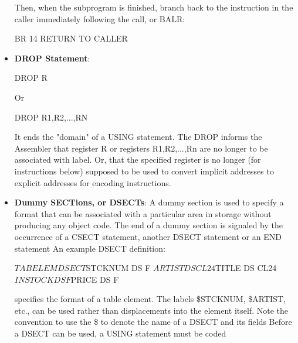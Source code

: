 \documentclass{report}
\begin{document}
\begin{itemize}
\begin{cppcode}
            \end{cppcode}
            \bigbreak \noindent 
            Then, when the subprogram is finished, branch back to the instruction in the caller immediately following the call, or BALR:
            \bigbreak \noindent 
            \begin{cppcode}
                BR 14 RETURN TO CALLER 
            \end{cppcode}
        \item \textbf{DROP Statement}:
            \bigbreak \noindent 
            \begin{cppcode}
            DROP R
            \end{cppcode}
            \bigbreak \noindent 
            Or
            \bigbreak \noindent 
            \begin{cppcode}
            DROP R1,R2,...,RN
            \end{cppcode}
            \bigbreak \noindent 
            It ends the "domain" of a USING statement. The DROP informs the Assembler that register R or registers R1,R2,...,Rn are no longer to be associated with label.
            \bigbreak \noindent 
            Or, that the specified register is no longer (for instructions below) supposed to be used to convert implicit addresses to explicit addresses for encoding instructions.
        \item \textbf{Dummy SECTions, or DSECTs}: A dummy section is used to specify a format that can be associated with a particular area in storage without producing any object code.
            \bigbreak \noindent 
            The end of a dummy section is signaled by the occurrence of a CSECT statement, another DSECT statement or an END statement
            \bigbreak \noindent 
            An example DSECT definition:
            \bigbreak \noindent 
            \begin{cppcode}
                $TABELEM DSECT
                $STCKNUM DS    F
                $ARTIST  DS    CL24
                $TITLE   DS    CL24
                $INSTOCK DS    F
                $PRICE   DS    F
            \end{cppcode}
            \bigbreak \noindent 
            specifies the format of a table element. The labels \$STCKNUM, \$ARTIST, etc., can be used rather than displacements into the element itself.
            \bigbreak \noindent 
            Note the convention to use the \$ to denote the name of a DSECT and its fields
            \bigbreak \noindent 
            Before a DSECT can be used, a USING statement must be coded

\end{itemize}
\end{document}

